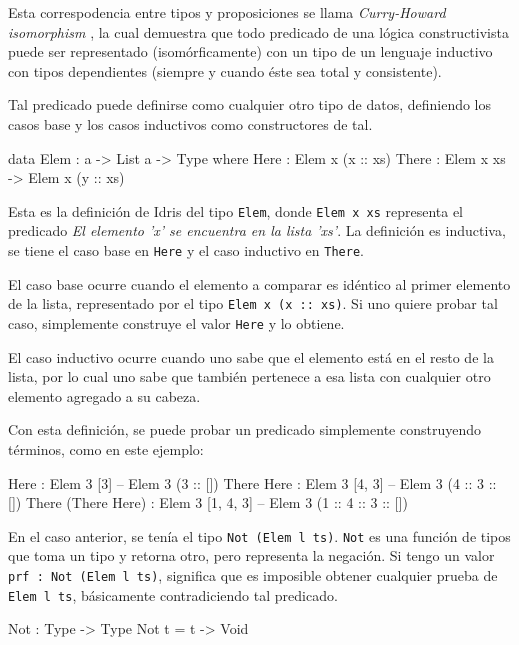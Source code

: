 Esta correspodencia entre tipos y proposiciones se llama \textit{Curry-Howard isomorphism} \cite{Howard80}, la cual demuestra que todo predicado de una lógica constructivista puede ser representado (isomórficamente) con un tipo de un lenguaje inductivo con tipos dependientes (siempre y cuando éste sea total y consistente).

Tal predicado puede definirse como cualquier otro tipo de datos, definiendo los casos base y los casos inductivos como constructores de tal.

\begin{code}
data Elem : a -> List a -> Type where
     Here : Elem x (x :: xs)
     There : Elem x xs -> Elem x (y :: xs)
\end{code}

Esta es la definición de Idris del tipo \texttt{Elem}, donde \texttt{Elem x xs} representa el predicado \textit{El elemento 'x' se encuentra en la lista 'xs'}. La definición es inductiva, se tiene el caso base en \texttt{Here} y el caso inductivo en \texttt{There}.

El caso base ocurre cuando el elemento a comparar es idéntico al primer elemento de la lista, representado por el tipo \texttt{Elem x (x :: xs)}. Si uno quiere probar tal caso, simplemente construye el valor \texttt{Here} y lo obtiene.

El caso inductivo ocurre cuando uno sabe que el elemento está en el resto de la lista, por lo cual uno sabe que también pertenece a esa lista con cualquier otro elemento agregado a su cabeza.

Con esta definición, se puede probar un predicado simplemente construyendo términos, como en este ejemplo:

\begin{code}
Here : Elem 3 [3] -- Elem 3 (3 :: [])
There Here : Elem 3 [4, 3] -- Elem 3 (4 :: 3 :: [])
There (There Here) : Elem 3 [1, 4, 3] 
  -- Elem 3 (1 :: 4 :: 3 :: [])
\end{code}

En el caso anterior, se tenía el tipo \texttt{Not (Elem l ts)}. \texttt{Not} es una función de tipos que toma un tipo y retorna otro, pero representa la negación. Si tengo un valor \texttt{prf : Not (Elem l ts)}, significa que es imposible obtener cualquier prueba de \texttt{Elem l ts}, básicamente contradiciendo tal predicado. 

\begin{code}
Not : Type -> Type
Not t = t -> Void
\end{code}


